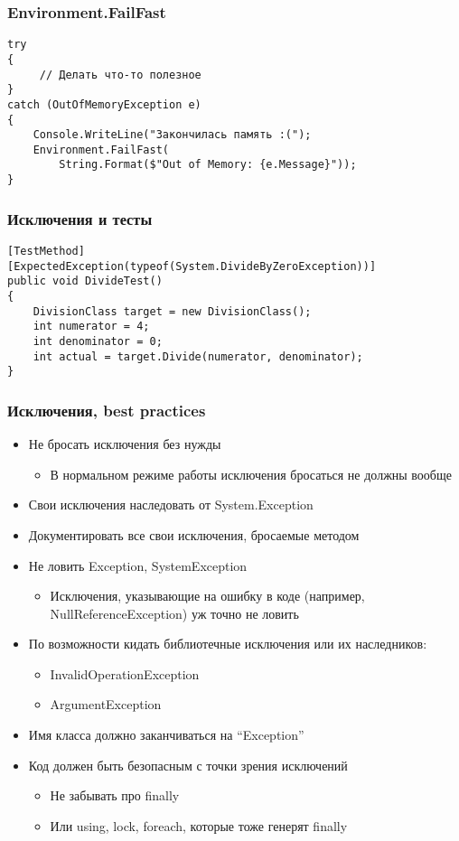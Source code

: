 \documentclass[xetex,mathserif,serif]{beamer}
\begin{document}
	\begin{frame}[fragile]
		\frametitle{Environment.FailFast}
		\begin{verbatim}
try 
{
     // Делать что-то полезное
}
catch (OutOfMemoryException e) 
{
    Console.WriteLine("Закончилась память :(");
    Environment.FailFast(
        String.Format($"Out of Memory: {e.Message}"));
}
		\end{verbatim}
	\end{frame}

	\begin{frame}[fragile]
		\frametitle{Исключения и тесты}
		\begin{verbatim}
[TestMethod]
[ExpectedException(typeof(System.DivideByZeroException))]
public void DivideTest()
{
    DivisionClass target = new DivisionClass();
    int numerator = 4;
    int denominator = 0;
    int actual = target.Divide(numerator, denominator);
}
		\end{verbatim}
	\end{frame}

	\begin{frame}
		\frametitle{Исключения, best practices}
		\begin{itemize}
			\item Не бросать исключения без нужды
			\begin{itemize}
				\item В нормальном режиме работы исключения бросаться не должны вообще
			\end{itemize}
			\item Свои исключения наследовать от System.Exception
			\item Документировать все свои исключения, бросаемые методом
			\item Не ловить Exception, SystemException
			\begin{itemize}
				\item Исключения, указывающие на ошибку в коде (например, NullReferenceException) уж точно не ловить
			\end{itemize}
			\item По возможности кидать библиотечные исключения или их наследников:
			\begin{itemize}
				\item InvalidOperationException
				\item ArgumentException
			\end{itemize}
			\item Имя класса должно заканчиваться на ``Exception''
			\item Код должен быть безопасным с точки зрения исключений
			\begin{itemize}
				\item Не забывать про finally 
				\item Или using, lock, foreach, которые тоже генерят finally
			\end{itemize}
		\end{itemize}
	\end{frame}
\end{document}
